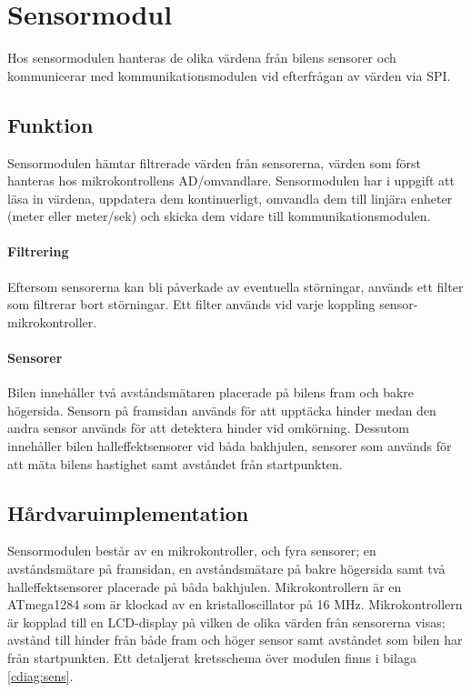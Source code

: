 \documentclass[tekniskrapport/tech.tex]{subfiles}
\begin{document}
\section{Sensormodul}
Hos sensormodulen hanteras de olika värdena från bilens sensorer och
kommunicerar med kommunikationsmodulen vid efterfrågan av värden via SPI.

\subsection{Funktion} Sensormodulen hämtar filtrerade värden från sensorerna,
värden som först hanteras hos mikrokontrollens AD/omvandlare. Sensormodulen
har i uppgift att läsa in värdena, uppdatera dem kontinuerligt, omvandla dem
till linjära enheter (meter eller meter/sek) och skicka dem vidare till
kommunikationsmodulen.

\paragraph{Filtrering} Eftersom sensorerna kan bli påverkade av eventuella
störningar, används ett filter som filtrerar bort störningar. Ett filter
används vid varje koppling sensor-mikrokontroller.

\paragraph{Sensorer} Bilen innehåller två avståndsmätaren placerade på bilens
fram och bakre högersida. Sensorn på framsidan används för att upptäcka hinder
medan den andra sensor används för att detektera hinder vid omkörning. Dessutom
innehåller bilen halleffektsensorer vid båda bakhjulen, sensorer som används
för att mäta bilens hastighet samt avståndet från startpunkten.

\subsection{Hårdvaruimplementation} Sensormodulen består av en mikrokontroller,
och fyra sensorer; en avståndsmätare på framsidan, en avståndsmätare på bakre
högersida samt två halleffektsensorer placerade på båda bakhjulen.
Mikrokontrollern är en ATmega1284 som är klockad av en kristalloscillator på 16
MHz. Mikrokontrollern är kopplad till en LCD-display på vilken de olika värden
från sensorerna visas; avstånd till hinder från både fram och höger sensor samt
avståndet som bilen har från startpunkten. Ett detaljerat kretsschema över
modulen finns i bilaga \ref{cdiag:sens}.
\end{document}
